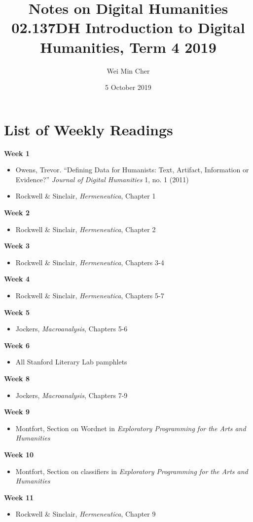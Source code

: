 \documentclass[a4paper]{article}
\title{Notes on Digital Humanities\\[0.1cm]
    \large 02.137DH Introduction to Digital Humanities, Term 4 2019}
\author{Wei Min Cher}
\date{5 October 2019}
\begin{document}
\maketitle

\tableofcontents
\newpage

\section*{List of Weekly Readings}
\noindent\textbf{Week 1}
\begin{itemize}
    \item Owens, Trevor. ``Defining Data for Humanists: Text, Artifact, Information or Evidence?'' \textit{Journal of Digital Humanities} 1, no. 1 (2011)
    \item Rockwell \& Sinclair, \textit{Hermeneutica}, Chapter 1
\end{itemize}
\noindent\textbf{Week 2}
\begin{itemize}
    \item Rockwell \& Sinclair, \textit{Hermeneutica}, Chapter 2
\end{itemize}
\noindent\textbf{Week 3}
\begin{itemize}
    \item Rockwell \& Sinclair, \textit{Hermeneutica}, Chapters 3-4
\end{itemize}
\noindent\textbf{Week 4}
\begin{itemize}
    \item Rockwell \& Sinclair, \textit{Hermeneutica}, Chapters 5-7
\end{itemize}
\noindent\textbf{Week 5}
\begin{itemize}
    \item Jockers, \textit{Macroanalysis}, Chapters 5-6
\end{itemize}
\noindent\textbf{Week 6}
\begin{itemize}
    \item All Stanford Literary Lab pamphlets
\end{itemize}
\noindent\textbf{Week 8}
\begin{itemize}
    \item Jockers, \textit{Macroanalysis}, Chapters 7-9
\end{itemize}
\noindent\textbf{Week 9}
\begin{itemize}
    \item Montfort, Section on Wordnet in \textit{Exploratory Programming for the Arts and Humanities}
\end{itemize}
\noindent\textbf{Week 10}
\begin{itemize}
    \item Montfort, Section on classifiers in \textit{Exploratory Programming for the Arts and Humanities}
\end{itemize}
\noindent\textbf{Week 11}
\begin{itemize}
    \item Rockwell \& Sinclair, \textit{Hermeneutica}, Chapter 9
\end{itemize}
\end{document}

